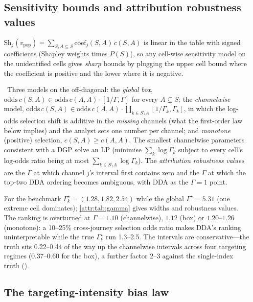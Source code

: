 \subsection{Sensitivity bounds and attribution robustness values}

$\mathrm{Sh}_j(v_{\mathrm{pop}}) = \sum_{S, A \subseteq S} \mathrm{coef}_j(S,A)\,c(S,A)$ is linear in the table with signed coefficients (Shapley weights times $P(S)$), so any cell-wise sensitivity model on the unidentified cells gives \emph{sharp} bounds by plugging the upper cell bound where the coefficient is positive and the lower where it is negative.

\begin{construction}
\label{attr:con:gamma}
\tagTransported\ Three models on the off-diagonal: the \emph{global box}, $\mathrm{odds}\,c(S,A) \in \mathrm{odds}\,c(A,A)\cdot[1/\Gamma, \Gamma]$ for every $A \subsetneq S$; the \emph{channelwise} model, $\mathrm{odds}\,c(S,A) \in \mathrm{odds}\,c(A,A)\cdot\prod_{k \in S \setminus A}[1/\Gamma_k, \Gamma_k]$, in which the log-odds selection shift is additive in the \emph{missing} channels (what the first-order law below implies) and the analyst sets one number per channel; and \emph{monotone} (positive) selection, $c(S,A) \ge c(A,A)$. The smallest channelwise parameters consistent with a DGP solve an LP (minimise $\sum_k \log\Gamma_k$ subject to every cell's log-odds ratio being at most $\sum_{k \in S \setminus A}\log\Gamma_k$). The \emph{attribution robustness values} are the $\Gamma$ at which channel $j$'s interval first contains zero and the $\Gamma$ at which the top-two DDA ordering becomes ambiguous, with DDA as the $\Gamma = 1$ point.
\end{construction}

For the benchmark $\Gamma_k^\star = (1.28, 1.82, 2.54)$ while the global $\Gamma^\star = 5.31$ (one extreme cell dominates); \cref{attr:tab:gamma} gives widths and robustness values. The ranking is overturned at $\Gamma = 1.10$ (channelwise), $1.12$ (box) or $1.20$--$1.26$ (monotone): a 10--25\% cross-journey selection odds ratio makes DDA's ranking uninterpretable while the true $\Gamma_k^\star$ run 1.3--2.5. The intervals are conservative---the truth sits 0.22--0.44 of the way up the channelwise intervals across four targeting regimes (0.37--0.60 for the box), a further factor 2--3 against the single-index truth ().

\subsection{The targeting-intensity bias law}
\label{attr:sec:biaslaw}

